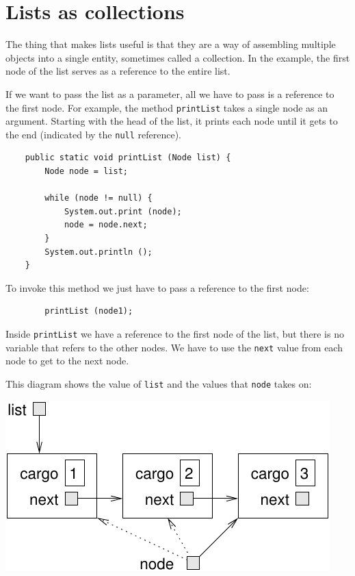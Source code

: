 \documentclass[12pt]{book}
\theoremstyle{exercise}
\begin{document}
\section{Lists as collections}

The thing that makes lists useful is that they are a way of assembling
multiple objects into a single entity, sometimes called a collection.
In the example, the first node of the list serves as a reference to
the entire list.


If we want to pass the list as a parameter, all we have to pass is a
reference to the first node.  For example, the method {\tt printList}
takes a single node as an argument.  Starting with the head of the
list, it prints each node until it gets to the end (indicated by the
{\tt null} reference).

\begin{verbatim}
    public static void printList (Node list) {
        Node node = list;

        while (node != null) {
            System.out.print (node);
            node = node.next;
        }
        System.out.println ();
    }
\end{verbatim}
%
To invoke this method we just have to pass a reference to the
first node:

\begin{verbatim}
        printList (node1);
\end{verbatim}
%
Inside {\tt printList} we have a reference to the first node
of the list, but there is no variable that refers to the other
nodes.  We have to use the {\tt next} value from each node
to get to the next node.

This diagram shows the value of {\tt list} and the values that
{\tt node} takes on:

\includegraphics{figs/list3.pdf}
\end{document}
